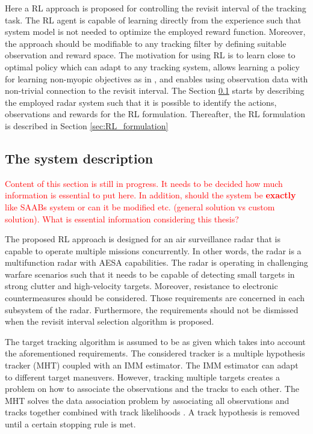 \documentclass[english, 12pt, a4paper, elec, utf8, a-1b, online]{aaltothesis}
\begin{document}
Here a RL approach is proposed for controlling the revisit interval of the tracking task.
The RL agent is capable of learning directly from the experience such that 
system model is not needed to optimize the employed reward function.
Moreover, the approach should be modifiable to any tracking filter by defining suitable observation and reward space.
The motivation for using RL is to learn close to optimal policy which can adapt to any tracking system, allows learning a policy for learning non-myopic objectives as in \cite{Charlish2015}, and enables using observation data with non-trivial connection to the revisit interval.
The Section \ref{seq:system_description} starts by describing the employed radar system such that it is possible to identify the actions, observations and rewards for the RL formulation.
Thereafter, the RL formulation is described in Section \ref{sec:RL_formulation} 


\subsection{The system description} \label{seq:system_description}

\textcolor{red}{Content of this section is still in progress. It needs to be decided how much information is essential to put here. In addition, should the system be \textbf{exactly} like SAABs system or can it be modified etc. (general solution vs custom solution). What is essential information considering this thesis?}

The proposed RL approach is designed for an air surveillance radar that is capable to operate multiple missions concurrently.
In other words, the radar is a multifunction radar with AESA capabilities.
The radar is operating in challenging warfare scenarios such that it needs to be capable of detecting small targets in strong clutter and high-velocity targets.
Moreover, resistance to electronic countermeasures should be considered. 
Those requirements are concerned in each subsystem of the radar. 
Furthermore, the requirements should not be dismissed when the revisit interval selection algorithm is proposed.

The target tracking algorithm is assumed to be as given which takes into account the aforementioned requirements. 
The considered tracker is a multiple hypothesis tracker (MHT) coupled with an IMM estimator. 
The IMM estimator can adapt to different target maneuvers. 
However, tracking multiple targets creates a problem on how to associate the observations and the tracks to each other. 
The MHT solves the data association problem by associating all observations and tracks together combined with track likelihoods \cite{Blackman2004}. 
A track hypothesis is removed until a certain stopping rule is met. 
\end{document}
